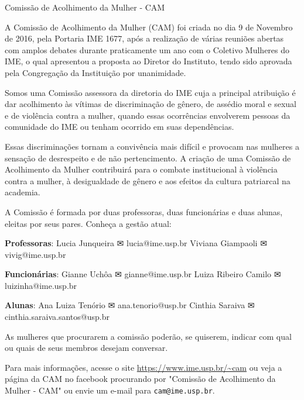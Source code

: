 \begin{subsecao}{Comissão de Acolhimento da Mulher - CAM}

A Comissão de Acolhimento da Mulher (CAM) foi criada no dia 9 de Novembro de 2016,
pela Portaria IME 1677, após a realização de várias reuniões abertas com amplos
debates durante praticamente um ano com o Coletivo Mulheres do IME, o qual 
apresentou a proposta ao Diretor do Instituto, tendo sido aprovada pela Congregação
da Instituição por unanimidade.

Somos uma Comissão assessora da diretoria do IME cuja a principal atribuição 
é dar acolhimento às vítimas de discriminação de gênero, de assédio moral e 
sexual e de violência contra a mulher, quando essas ocorrências envolverem 
pessoas da comunidade do IME ou tenham ocorrido em suas dependências.

Essas discriminações tornam a convivência mais difícil e provocam nas mulheres
a sensação de desrespeito e de não pertencimento. A criação de uma Comissão de 
Acolhimento da Mulher contribuirá para o combate institucional à violência contra
a mulher, à desigualdade de gênero e aos efeitos da cultura patriarcal na academia.

A Comissão é formada por duas professoras, duas funcionárias e duas alunas, 
eleitas por seus pares. Conheça a gestão atual: 

\item \textbf{Professoras}: 
Lucia Junqueira ✉ lucia@ime.usp.br
Viviana Giampaoli ✉ vivig@ime.usp.br

\item \textbf{Funcionárias}: 
Gianne Uchôa ✉ gianne@ime.usp.br
Luiza Ribeiro Camilo ✉ luizinha@ime.usp.br

\item \textbf{Alunas}: 
Ana Luiza Tenório ✉ ana.tenorio@usp.br
Cinthia Saraiva ✉ cinthia.saraiva.santos@usp.br

As mulheres que procurarem a comissão poderão, se quiserem, indicar com qual ou 
quais de seus membros desejam conversar.

Para mais informações, acesse o site \url{https://www.ime.usp.br/~cam} ou veja
a página da CAM no facebook procurando por "Comissão de Acolhimento da Mulher - CAM" 
ou envie um e-mail para {\tt cam@ime.usp.br}. 


\end{subsecao}
